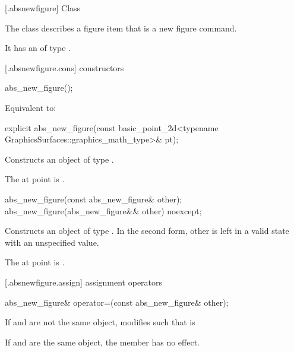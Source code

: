  [\iotwod.absnewfigure] {Class }

\pnum
{}%
The class  describes a figure item that is a new figure command.

\pnum
It has an  of type .

 [\iotwod.absnewfigure.cons] { constructors}%

%
\begin{itemdecl}
abs_new_figure();
\end{itemdecl}
\begin{itemdescr}
\pnum
\effects
Equivalent to: 
\end{itemdescr}

%
\begin{itemdecl}
explicit abs_new_figure(const basic_point_2d<typename
  GraphicsSurfaces::graphics_math_type>& pt);
\end{itemdecl}
\begin{itemdescr}
\pnum
\effects
Constructs an object of type .

\pnum
The at point is .
\end{itemdescr}

%
\begin{itemdecl}
abs_new_figure(const abs_new_figure& other);
abs_new_figure(abs_new_figure&& other) noexcept;
\end{itemdecl}
\begin{itemdescr}
\pnum
\effects
Constructs an object of type . In the second form, other is left in a valid state with an unspecified value.
	
\pnum
The at point is .
\end{itemdescr}

 [\iotwod.absnewfigure.assign] { assignment operators}%

%
\begin{itemdecl}
abs_new_figure& operator=(const abs_new_figure& other);
\end{itemdecl}
\begin{itemdescr}
\pnum
\effects
If  and  are not the same object, modifies  such that  is 

\pnum
If  and  are the same object, the member has no effect.
	
\pnum
\returns
{}
\end{itemdescr}

